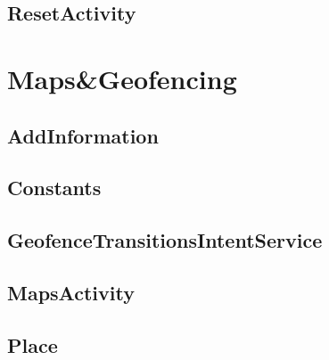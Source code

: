 \subsection{ResetActivity}



\section{Maps\&Geofencing}

\subsection{AddInformation}



\subsection{Constants}



\subsection{GeofenceTransitionsIntentService}



\subsection{MapsActivity}



\subsection{Place}




